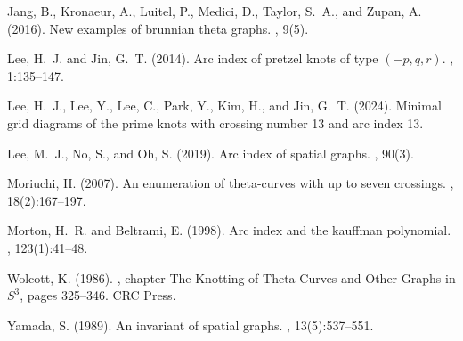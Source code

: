 \begin{frame}
\begin{thebibliography}
  Jang, B., Kronaeur, A., Luitel, P., Medici, D., Taylor, S.~A., and Zupan, A.
    (2016).
  \newblock New examples of brunnian theta graphs.
  , 9(5).
  
  Lee, H.~J. and Jin, G.~T. (2014).
  \newblock Arc index of pretzel knots of type $(-p,q,r)$.
  ,
    1:135--147.
  
  Lee, H.~J., Lee, Y., Lee, C., Park, Y., Kim, H., and Jin, G.~T. (2024).
  \newblock Minimal grid diagrams of the prime knots with crossing number 13 and
    arc index 13.
  
  Lee, M.~J., No, S., and Oh, S. (2019).
  \newblock Arc index of spatial graphs.
  , 90(3).
  
  Moriuchi, H. (2007).
  \newblock An enumeration of theta-curves with up to seven crossings.
  , 18(2):167--197.
  
  Morton, H.~R. and Beltrami, E. (1998).
  \newblock Arc index and the kauffman polynomial.
  , 123(1):41--48.
  
  Wolcott, K. (1986).
  , chapter
    The Knotting of Theta Curves and Other Graphs in $S^3$, pages 325--346.
  \newblock CRC Press.
  
  Yamada, S. (1989).
  \newblock An invariant of spatial graphs.
  , 13(5):537--551.  
\end{thebibliography}
\end{frame}
